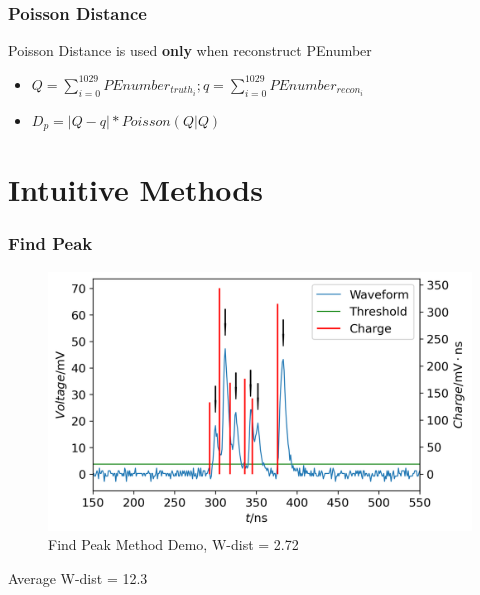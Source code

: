 \documentclass{beamer}
\begin{document}
\begin{frame}
\frametitle{Poisson Distance}
\hspace{4mm}Poisson Distance is used \textbf{only} when reconstruct PEnumber
\begin{itemize}
    \item $Q = \sum_{i=0}^{1029}PEnumber_{truth_i}; q = \sum_{i=0}^{1029}PEnumber_{recon_i}$
    \item $D_{p} = |Q-q|*Poisson(Q|Q)$
\end{itemize}
\end{frame}

\section{Intuitive Methods}
\begin{frame}
\frametitle{Find Peak}
\begin{figure}
    \centering
    \caption{Find Peak Method Demo, W-dist = 2.72}
    \includegraphics[width=0.9\linewidth]{img/findpeak.png}
\end{figure}
\vspace{-4mm}
\begin{center}
    Average W-dist = 12.3
\end{center}
\end{frame}
\end{document}
